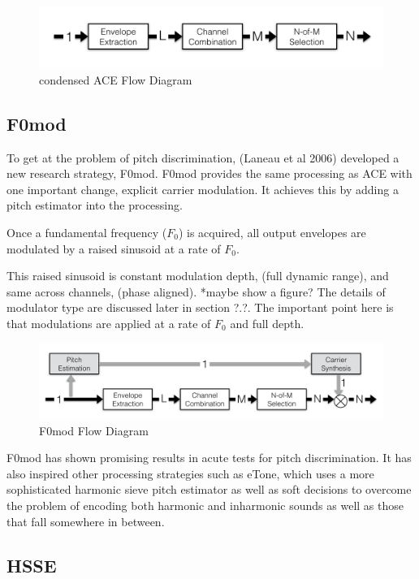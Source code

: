 \documentclass [11pt, proquest] {uwthesis}[2015/03/03]
\begin{document}
\begin{figure}[!ht]
  \centering
    \includegraphics[width=1\textwidth]{ACE_flow_diagramTEMP}   
    \caption{condensed ACE Flow Diagram}
\end{figure}

\subsection{F0mod}

To get at the problem of pitch discrimination, (Laneau et al 2006) developed a new research strategy, F0mod.  F0mod provides the same processing as ACE with one important change, explicit carrier modulation.  It achieves this by adding a pitch estimator into the processing.

Once a fundamental frequency ($F_0$) is acquired, all output envelopes are modulated by a raised sinusoid at a rate of $F_0$.  

This raised sinusoid is constant modulation depth, (full dynamic range), and same across channels, (phase aligned).  *maybe show a figure?  The details of modulator type are discussed later in section ?.?.  The important point here is that modulations are applied at a rate of $F_0$ and full depth.

\begin{figure}[!ht]
  \centering
    \includegraphics[width=1\textwidth]{F0mod_flow_diagramTEMP}   
    \caption{F0mod Flow Diagram}
\end{figure}

F0mod has shown promising results in acute tests for pitch discrimination.  It has also inspired other processing strategies such as eTone, which uses a more sophisticated harmonic sieve pitch estimator as well as soft decisions to overcome the problem of encoding both harmonic and inharmonic sounds as well as those that fall somewhere in between.

\subsection{HSSE}
\end{document}
